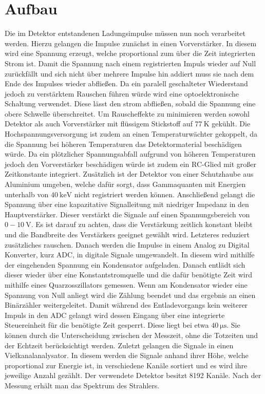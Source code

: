 \section{Aufbau}
\label{sec:Aufbau}

Die im Detektor entstandenen Ladungsimpulse müssen nun noch verarbeitet werden. Hierzu gelangen die Impulse zunächst in einen Vorverstärker. In diesem wird eine Spannung erzeugt, welche proportional zum über die Zeit integrierten Strom ist. Damit die Spannung nach einem registrierten Impuls wieder auf Null zurückfällt und sich nicht über mehrere Impulse hin addiert muss sie nach dem Ende des Impulses wieder abfließen. Da ein paralell geschalteter Wiederstand jedoch zu verstärktem Rauschen führen würde wird eine optoelektronische Schaltung verwendet. Diese lässt den strom abfließen, sobald die Spannung eine obere Schwelle überschreitet. Um Rauscheffekte zu minimieren werden sowohl Detektor als auch Vorverstärker mit flüssigem Stickstoff auf $\SI{77}{\kelvin}$ gekühlt. Die Hochspannungsversorgung ist zudem an einen Temperaturwächter gekoppelt, da die Spannung bei höheren Temperaturen das Detektormaterial beschädigen würde. Da ein plötzlicher Spannungsabfall aufgrund von höheren Temperaturen jedoch den Vorverstärker beschädigen würde ist zudem ein RC-Glied mit großer Zeitkonstante integriert. Zusätzlich ist der Detektor von einer Schutzhaube aus Aluminium umgeben, welche dafür sorgt, dass Gammaquanten mit Energien unterhalb von $\SI{40}{\kilo\electronvolt}$ nicht registriert werden können. Anschließend gelangt die Spannung über eine kapazitative Signalleitung mit niedriger Impedanz in den Hauptverstärker. Dieser verstärkt die Signale auf einen Spannungsbereich von $0 - \SI{10}{\volt}$. Es ist darauf zu achten, dass die Verstärkung zeitlich konstant bleibt und die Bandbreite des Verstärkers geeignet gewählt wird. Letzteres reduziert zusätzliches rauschen. Danach werden die Impulse in einem Analog zu Digital Konverter, kurz ADC, in digitale Signale umgewandelt. In diesem wird mithilfe der eingehenden Spannung ein Kondensator aufgeladen. Danach entlädt sich dieser wieder über eine Konstantstromquelle und die dafür benötigte Zeit wird mithilfe eines Quarzosszillators gemessen. Wenn am Kondensator wieder eine Spannung von Null anliegt wird die Zählung beendet und das ergebnis an einen Binärzähler weitergeleitet. Damit während des Entladevorgangs kein weiterer Impuls in den ADC gelangt wird dessen Eingang über eine integrierte Steuereinheit für die benötigte Zeit gesperrt. Diese liegt bei etwa $\SI{40}{\micro\second}$. Sie können durch die Unterscheidung zwischen der Messzeit, ohne die Totzeiten und der Echtzeit berücksichtigt werden. Zuletzt gelangen die Signale in einen Vielkanalanalysator. In diesem werden die Signale anhand ihrer Höhe, welche proportional zur Energie ist, in verschiedene Kanäle sortiert und es wird ihre jeweilige Anzahl gezählt. Der verwendete Detektor besitzt 8192 Kanäle. Nach der Messung erhält man das Spektrum des Strahlers.